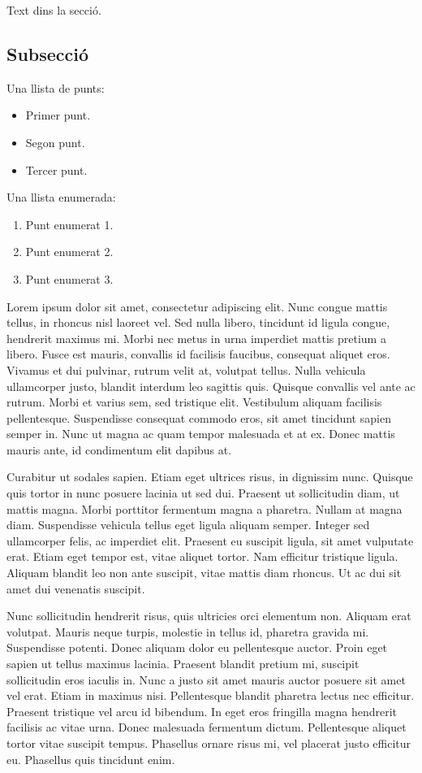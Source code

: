\documentclass[a4paper,12pt,twoside]{ThesisStyle}
\begin{document}
Text dins la secció.

\subsection{Subsecció}

Una llista de punts:

\begin{itemize}
    \item Primer punt.
    \item Segon punt.
    \item Tercer punt.
\end{itemize}

Una llista enumerada:

\begin{enumerate}
    \item Punt enumerat 1.
    \item Punt enumerat 2.
    \item Punt enumerat 3.
\end{enumerate}

Lorem ipsum dolor sit amet, consectetur adipiscing elit. Nunc congue mattis tellus, in rhoncus nisl laoreet vel. Sed nulla libero, tincidunt id ligula congue, hendrerit maximus mi. Morbi nec metus in urna imperdiet mattis pretium a libero. Fusce est mauris, convallis id facilisis faucibus, consequat aliquet eros. Vivamus et dui pulvinar, rutrum velit at, volutpat tellus. Nulla vehicula ullamcorper justo, blandit interdum leo sagittis quis. Quisque convallis vel ante ac rutrum. Morbi et varius sem, sed tristique elit. Vestibulum aliquam facilisis pellentesque. Suspendisse consequat commodo eros, sit amet tincidunt sapien semper in. Nunc ut magna ac quam tempor malesuada et at ex. Donec mattis mauris ante, id condimentum elit dapibus at.

Curabitur ut sodales sapien. Etiam eget ultrices risus, in dignissim nunc. Quisque quis tortor in nunc posuere lacinia ut sed dui. Praesent ut sollicitudin diam, ut mattis magna. Morbi porttitor fermentum magna a pharetra. Nullam at magna diam. Suspendisse vehicula tellus eget ligula aliquam semper. Integer sed ullamcorper felis, ac imperdiet elit. Praesent eu suscipit ligula, sit amet vulputate erat. Etiam eget tempor est, vitae aliquet tortor. Nam efficitur tristique ligula. Aliquam blandit leo non ante suscipit, vitae mattis diam rhoncus. Ut ac dui sit amet dui venenatis suscipit.

Nunc sollicitudin hendrerit risus, quis ultricies orci elementum non. Aliquam erat volutpat. Mauris neque turpis, molestie in tellus id, pharetra gravida mi. Suspendisse potenti. Donec aliquam dolor eu pellentesque auctor. Proin eget sapien ut tellus maximus lacinia. Praesent blandit pretium mi, suscipit sollicitudin eros iaculis in. Nunc a justo sit amet mauris auctor posuere sit amet vel erat. Etiam in maximus nisi. Pellentesque blandit pharetra lectus nec efficitur. Praesent tristique vel arcu id bibendum. In eget eros fringilla magna hendrerit facilisis ac vitae urna. Donec malesuada fermentum dictum. Pellentesque aliquet tortor vitae suscipit tempus. Phasellus ornare risus mi, vel placerat justo efficitur eu. Phasellus quis tincidunt enim.
\end{document}
